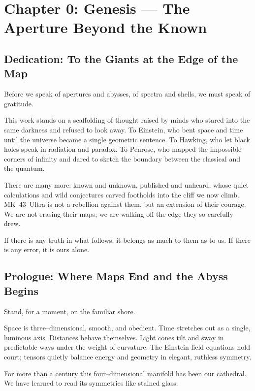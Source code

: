 

\chapter{Chapter 0: Genesis — The Aperture Beyond the Known}
\label{ch:genesis}

\section*{Dedication: To the Giants at the Edge of the Map}
Before we speak of apertures and abysses, of spectra and shells, we must speak of gratitude.

This work stands on a scaffolding of thought raised by minds who stared into the same darkness
and refused to look away. To Einstein, who bent space and time until the universe became a single
geometric sentence. To Hawking, who let black holes speak in radiation and paradox. To Penrose,
who mapped the impossible corners of infinity and dared to sketch the boundary between the
classical and the quantum.

There are many more: known and unknown, published and unheard, whose quiet calculations and
wild conjectures carved footholds into the cliff we now climb. MK~43~Ultra is not a rebellion
against them, but an extension of their courage. We are not erasing their maps; we are walking
off the edge they so carefully drew.

If there is any truth in what follows, it belongs as much to them as to us.
If there is any error, it is ours alone.

\section*{Prologue: Where Maps End and the Abyss Begins}
Stand, for a moment, on the familiar shore.

Space is three–dimensional, smooth, and obedient. Time stretches out as a single, luminous axis.
Distances behave themselves. Light cones tilt and sway in predictable ways under the weight of
curvature. The Einstein field equations hold court; tensors quietly balance energy and geometry
in elegant, ruthless symmetry.

For more than a century this four–dimensional manifold has been our cathedral.
We have learned to read its symmetries like stained glass.

